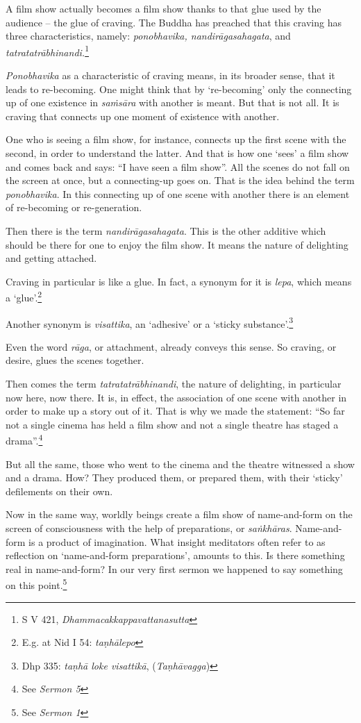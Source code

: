 A film show actually becomes a film show thanks to that glue used by the audience -- the glue of craving. The Buddha has preached that this craving has three characteristics, namely: \emph{ponobhavika, nandirāgasahagata}, and \emph{tatratatrābhinandi.}\footnote{S V 421, \emph{Dhammacakkappavattanasutta}}

\emph{Ponobhavika} as a characteristic of craving means, in its broader sense, that it leads to re-becoming. One might think that by `re-becoming' only the connecting up of one existence in \emph{saṁsāra} with another is meant. But that is not all. It is craving that connects up one moment of existence with another.

One who is seeing a film show, for instance, connects up the first scene with the second, in order to understand the latter. And that is how one `sees' a film show and comes back and says: ``I have seen a film show''. All the scenes do not fall on the screen at once, but a connecting-up goes on. That is the idea behind the term \emph{ponobhavika}. In this connecting up of one scene with another there is an element of re-becoming or re-generation.

Then there is the term \emph{nandirāgasahagata}. This is the other additive which should be there for one to enjoy the film show. It means the nature of delighting and getting attached.

Craving in particular is like a glue. In fact, a synonym for it is \emph{lepa}, which means a `glue'.\footnote{E.g. at Nid I 54: \emph{taṇhālepo}}

Another synonym is \emph{visattika}, an `adhesive' or a `sticky substance'.\footnote{Dhp 335: \emph{taṇhā loke visattikā}, (\emph{Taṇhāvagga})}

Even the word \emph{rāga}, or attachment, already conveys this sense. So craving, or desire, glues the scenes together.

Then comes the term \emph{tatratatrābhinandi}, the nature of delighting, in particular now here, now there. It is, in effect, the association of one scene with another in order to make up a story out of it. That is why we made the statement: ``So far not a single cinema has held a film show and not a single theatre has staged a drama''.\footnote{See \emph{Sermon 5}}

But all the same, those who went to the cinema and the theatre witnessed a show and a drama. How? They produced them, or prepared them, with their `sticky' defilements on their own.

Now in the same way, worldly beings create a film show of name-and-form on the screen of consciousness with the help of preparations, or \emph{saṅkhāras}. Name-and-form is a product of imagination. What insight meditators often refer to as reflection on `name-and-form preparations', amounts to this. Is there something real in name-and-form? In our very first sermon we happened to say something on this point.\footnote{See \emph{Sermon 1}}

